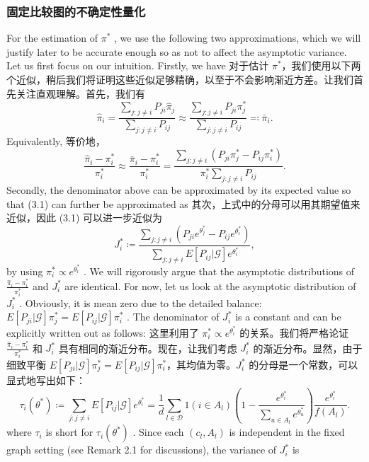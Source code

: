 \subsubsection{固定比较图的不确定性量化}

For the estimation of $\pi^{*}$ , we use the following two approximations, which we will justify later to be accurate enough so as not to affect the asymptotic variance. Let us first focus on our intuition. Firstly, we have
对于估计 $\pi^{*}$，我们使用以下两个近似，稍后我们将证明这些近似足够精确，以至于不会影响渐近方差。让我们首先关注直观理解。首先，我们有
$$
\widehat{\pi}_{i} = \frac{\sum_{j:j\neq i}P_{ji}\widehat{\pi}_{j}}{\sum_{j:j\neq i}P_{ij}}\approx \frac{\sum_{j:j\neq i}P_{ji}\pi_{j}^{*}}{\sum_{j:j\neq i}P_{ij}} \eqqcolon \bar{\pi}_{i}.
$$
Equivalently,
等价地，
\[
\frac{\widehat{\pi}_{i} - \pi_{i}^{*}}{\pi_{i}^{*}}\approx \frac{\bar{\pi}_{i} - \pi_{i}^{*}}{\pi_{i}^{*}} = \frac{\sum_{j:j\neq i}(P_{ji}\pi_{j}^{*} - P_{ij}\pi_{i}^{*})}{\pi_{i}^{*}\sum_{j:j\neq i}P_{ij}}. \tag{3.1}
\]
Secondly, the denominator above can be approximated by its expected value so that (3.1) can further be approximated as
其次，上式中的分母可以用其期望值来近似，因此 (3.1) 可以进一步近似为
\[
J_{i}^{*}\coloneqq \frac{\sum_{j:j\neq i}(P_{ji}e^{\theta_{j}^{*}} - P_{ij}e^{\theta_{i}^{*}})}{\sum_{j:j\neq i}E[P_{ij}|\mathcal{G}]e^{\theta_{i}^{*}}}, \tag{3.2}
\]
by using $\pi_{i}^{*}\propto e^{\theta_{i}^{*}}$ . We will rigorously argue that the asymptotic distributions of $\frac{\widehat{\pi}_{i} - \pi_{i}^{*}}{\pi_{i}^{*}}$ and $J_{i}^{*}$ are identical. For now, let us look at the asymptotic distribution of $J_{i}^{*}$ . Obviously, it is mean zero due to the detailed balance: $E[P_{ji}|\mathcal{G}]\pi_{j}^{*} = E[P_{ij}|\mathcal{G}]\pi_{i}^{*}$ . The denominator of $J_{i}^{*}$ is a constant and can be explicitly written out as follows:
这里利用了 $\pi_{i}^{*}\propto e^{\theta_{i}^{*}}$ 的关系。我们将严格论证 $\frac{\widehat{\pi}_{i} - \pi_{i}^{*}}{\pi_{i}^{*}}$ 和 $J_{i}^{*}$ 具有相同的渐近分布。现在，让我们考虑 $J_{i}^{*}$ 的渐近分布。显然，由于细致平衡 $E[P_{ji}|\mathcal{G}]\pi_{j}^{*} = E[P_{ij}|\mathcal{G}]\pi_{i}^{*}$，其均值为零。$J_{i}^{*}$ 的分母是一个常数，可以显式地写出如下：
\[
\tau_{i}(\theta^{*})\coloneqq \sum_{j:j\neq i}E[P_{ij}|\mathcal{G}]e^{\theta_{i}^{*}} = \frac{1}{d}\sum_{l\in \mathcal{D}}1(i\in A_{l})\left(1 - \frac{e^{\theta_{i}^{*}}}{\sum_{u\in A_{l}}e^{\theta_{u}^{*}}}\right)\frac{e^{\theta_{i}^{*}}}{f(A_{l})}. \tag{3.3}
\]
where $\tau_{i}$ is short for $\tau_{i}(\theta^{*})$ . Since each $(c_{l},A_{l})$ is independent in the fixed graph setting (see Remark 2.1 for discussions), the variance of $J_{i}^{*}$ is
